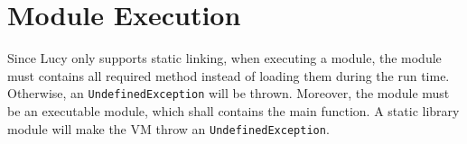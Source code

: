 \section{Module Execution}
Since Lucy only supports static linking, when executing a module, the module must contains all required method instead of loading them during the run time. Otherwise, an \texttt{UndefinedException} will be thrown. Moreover, the module must be an executable module, which shall contains the main function. A static library module will make the VM throw an \texttt{UndefinedException}.
